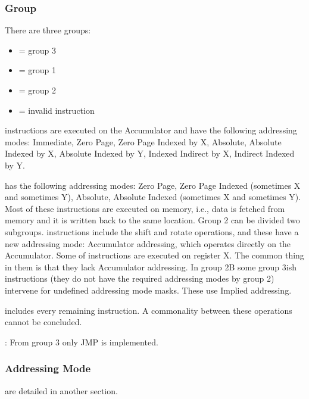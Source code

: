 \documentclass[letterpaper,10pt,english]{sphinxmanual}
\begin{document}
\subsubsection{Group}
\label{\detokenize{id_6502:group}}
\sphinxAtStartPar
There are three groups:
\begin{itemize}
\item {} 
 = group 3

\item {} 
 = group 1

\item {} 
 = group 2

\item {} 
 = invalid instruction

\end{itemize}

\sphinxAtStartPar
{} instructions are executed on the Accumulator and have the following
addressing modes: Immediate, Zero Page, Zero Page Indexed by X, Absolute,
Absolute Indexed by X, Absolute Indexed by Y, Indexed Indirect by X, Indirect
Indexed by Y.

\sphinxAtStartPar
{} has the following addressing modes: Zero Page, Zero Page Indexed
(sometimes X and sometimes Y), Absolute, Absolute Indexed (sometimes X and
sometimes Y). Most of these instructions are executed on memory, i.e., data is
fetched from memory and it is written back to the same location. Group 2 can be
divided two subgroups.  instructions include the shift and rotate
operations, and these have a new addressing mode: Accumulator addressing, which
operates directly on the Accumulator. Some of  instructions are
executed on register X. The common thing in them is that they lack Accumulator
addressing. In group 2B some group 3\sphinxhyphen{}ish instructions (they do not have the
required addressing modes by group 2) intervene for undefined addressing mode
masks. These use Implied addressing.

\sphinxAtStartPar
{} includes every remaining instruction. A commonality between these
operations cannot be concluded.

\sphinxAtStartPar
{}: From group 3 only JMP is implemented.


\subsubsection{Addressing Mode}
\label{\detokenize{id_6502:addressing-mode}}
\sphinxAtStartPar
{\hyperref[\detokenize{core_6502:addr-mode}]{}} are detailed in another section.
\end{document}

